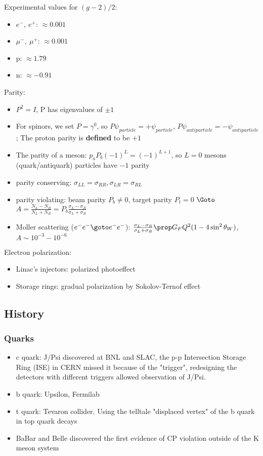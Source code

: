 Experimental values for $(g-2)/2$:
\begin{itemize}
    \item $e^-, \ e^+$: $\approx 0.001$
    \item $\mu^-, \ \mu^+$: $\approx 0.001$
    \item p: $\approx 1.79$
    \item n: $\approx -0.91$
\end{itemize}

Parity:
\begin{itemize}
    \item $P^2 = I$, P has eigenvalues of $\pm 1$
    \item For spinors, we set $P = \gamma^0$, so $P\psi_{particle} = +\psi_{particle}$, $P\psi_{antiparticle} = -\psi_{antiparticle}$;
    The proton parity is \textbf{defined} to be $+1$
\item The parity of a meson: $p_a P_b (-1)^{L} = (-1)^{L+1}$, so $L=0$ mesons (quark/antiquark) particles have $-1$ parity
    \item parity conserving: $\sigma_{LL} = \sigma_{RR}, \sigma_{LR} = \sigma_{RL}$
    \item parity violating: beam parity $P_b \ne 0$, target parity $P_t = 0$ $\Goto$ $A = \frac{N_L - N_R}{N_L + N_R} = P_b \frac{\sigma_L - \sigma_R}{\sigma_L + \sigma_R}$
    \item Moller scattering ($e^- e^- \goto e^- e^-$): $\frac{\sigma_L - \sigma_R}{\sigma_L + \sigma_R} \prop G_F Q^2 ( 1- 4\sin^2\theta_W)$, $A \sim 10^{-3} - 10^{-6}$
\end{itemize}

Electron polarization:
\begin{itemize}
    \item Linac's injectors: polarized photoeffect
    \item Storage rings: gradual polarization by Sokolov-Ternof effect
\end{itemize}

\subsection{History}
\subsubsection{Quarks}
\begin{itemize}
    \item c quark: J/Psi discovered at BNL and SLAC, the p-p Intersection Storage Ring (ISE) in CERN missed it because of the "trigger", redesigning the detectors with different triggers allowed observation of J/Psi.
    \item b quark: Upsilon, Fermilab
    \item t quark: Tevaron collider. Using the telltale "displaced vertex" of the b quark in top quark decays
\end{itemize}

\begin{itemize}
    \item BaBar and Belle discovered the first evidence of CP violation outside of the K meson system
\end{itemize}
